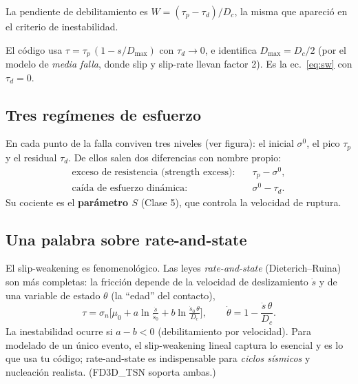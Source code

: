 \documentclass[11pt,a4paper]{article}
\newcommand{\Dc}{D_c}
\newcommand{\taup}{\tau_p}
\newcommand{\taud}{\tau_d}
\begin{document}
\begin{center}
\end{center}

\noindent
La pendiente de debilitamiento es $W=(\taup-\taud)/\Dc$, la misma que apareció en
el criterio de inestabilidad.

\begin{codebox}
El código usa $\tau=\taup\,(1-s/D_{\max})$ con $\taud\to0$, e identifica
$D_{\max}=\Dc/2$ (por el modelo de \emph{media falla}, donde slip y slip-rate
llevan factor 2). Es la ec.~\eqref{eq:sw} con $\taud=0$.
\end{codebox}

\subsection{Tres regímenes de esfuerzo}
En cada punto de la falla conviven tres niveles (ver figura): el inicial
$\sigma^0$, el pico $\taup$ y el residual $\taud$. De ellos salen dos diferencias
con nombre propio:
\begin{align}
  \text{exceso de resistencia (strength excess):}\quad & \taup-\sigma^0,\\
  \text{caída de esfuerzo dinámica:}\quad & \sigma^0-\taud.
\end{align}
Su cociente es el \textbf{parámetro $S$} (Clase 5), que controla la velocidad de
ruptura.

\subsection{Una palabra sobre rate-and-state}
El slip-weakening es fenomenológico. Las leyes \emph{rate-and-state}
(Dieterich--Ruina) son más completas: la fricción depende de la velocidad de
deslizamiento $\dot s$ y de una variable de estado $\theta$ (la ``edad'' del
contacto),
\begin{equation}
  \tau = \sigma_n\Big[\mu_0 + a\ln\tfrac{\dot s}{\dot s_0}
        + b\ln\tfrac{\dot s_0\,\theta}{\Dc}\Big],\qquad
  \dot\theta = 1-\frac{\dot s\,\theta}{\Dc}.
\end{equation}
La inestabilidad ocurre si $a-b<0$ (debilitamiento por velocidad). Para
modelado de un único evento, el slip-weakening lineal captura lo esencial y es lo
que usa tu código; rate-and-state es indispensable para \emph{ciclos sísmicos} y
nucleación realista. (FD3D\_TSN soporta ambas.)
\end{document}
